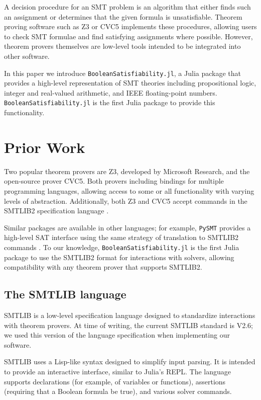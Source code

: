\documentclass[conference]{IEEEtran}
\begin{document}
A decision procedure for an SMT problem is an algorithm that either finds such an assignment or determines that the given formula is unsatisfiable.  Theorem proving software such as Z3 or CVC5 \cite{z3, cvc5}
implements these procedures, allowing users to check SMT formulae and find satisfying assignments where possible. However, theorem provers themselves are low-level tools intended to be integrated into other software.

In this paper we introduce \verb|BooleanSatisfiability.jl|, a Julia package that provides a high-level representation of SMT theories including propositional logic, integer and real-valued arithmetic, and IEEE floating-point numbers. \verb|BooleanSatisfiability.jl| is the first Julia package to provide this functionality.

\section{Prior Work}
Two popular theorem provers are Z3, developed by Microsoft Research, and the open-source prover CVC5. Both provers including bindings for multiple programming languages, allowing access to some or all functionality with varying levels of abstraction. Additionally, both Z3 and CVC5 accept commands in the SMTLIB2 specification language \cite{smtlib2}.

Similar packages are available in other languages; for example, \verb|PySMT| provides a high-level SAT interface using the same strategy of translation to SMTLIB2 commands \cite{pysmt2015}.
To our knowledge, \verb|BooleanSatisfiability.jl| is the first Julia package to use the SMTLIB2 format for interactions with solvers, allowing compatibility with any theorem prover that supports SMTLIB2.

\subsection{The SMTLIB language}
SMTLIB is a low-level specification language designed to standardize interactions with theorem provers. At time of writing, the current SMTLIB standard is V2.6; we used this version of the language specification when implementing our software.

SMTLIB uses a Lisp-like syntax designed to simplify input parsing. It is intended to provide an interactive interface, similar to Julia's REPL. The language supports declarations (for example, of variables or functions), assertions (requiring that a Boolean formula be true), and various solver commands.
\end{document}
